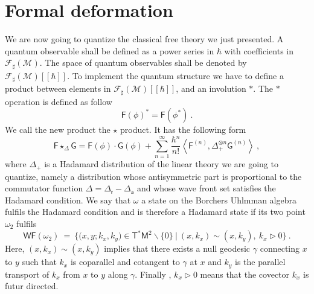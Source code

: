 \documentclass[10pt]{book}
\newcommand{\WF}{\mathsf{WF}}
\newcommand{\sm}[1]{\left\langle#1\right\rangle}
\newcommand{\Fcal}{\mathcal{F}}
\newcommand{\Mcal}{\mathcal{M}}
\newcommand{\Fsf}{\mathsf{F}}
\newcommand{\Gsf}{\mathsf{G}}
\newcommand{\Msf}{\mathsf{M}}
\newcommand{\Tsf}{\mathsf{T}}
\newcommand{\asf}{\mathsf{a}}
\newcommand{\rsf}{\mathsf{r}}
\theoremstyle{break}
\begin{document}


\section{Formal deformation}


We are now going to quantize the classical free theory we just presented. A quantum observable shall be defined as a power series in $\hbar$ with coefficients in $\Fcal_\sharp(\Mcal)$. The space of quantum observables shall be denoted by $\Fcal_\sharp(\Mcal)[[\hbar]]$. To implement the quantum structure we have to define a product between elements in $\Fcal_\sharp(\Mcal)[[\hbar]]$, and an involution $\ast$. The $\ast$ operation is defined as follow
%
\begin{equation*}
\Fsf(\phi)^\ast =  \Fsf(\phi^\ast) \ .
\end{equation*}
%
We call the new product the $\star$ product. It has the following form
%
\begin{equation*}
\Fsf \star_\Delta \Gsf = \Fsf(\phi) \cdot \Gsf(\phi) + \sum_{n=1}^\infty \frac{\hbar^n}{n!} \sm{ \Fsf^{(n)} , \Delta_+^{\otimes n} \Gsf^{(n) } } \ ,
\end{equation*}
%
where $\Delta_+$ is a Hadamard distribution of the linear theory we are going to quantize, namely a distribution whose antisymmetric part is proportional to the commutator function $\Delta = \Delta_\rsf - \Delta_\asf$ and whose wave front set satisfies the Hadamard condition. We say that $\omega$ a state on the Borchers Uhlmman algebra fulfils the Hadamard condition and is therefore a Hadamard state if its two point $\omega_2$ fulfils
%
\begin{equation*}
\WF(\omega_2) \ = \ \bigg\{ \bigg( x, y ; k_x, k_y \bigg) \in \Tsf^\ast\Msf^2 \backslash \{0\} \ \bigg| \ (x,k_x) \sim (x,k_y), \ k_x \triangleright 0 \bigg\} \ .
\label{eq:Hadamard_condition}
\end{equation*}
%
Here, $(x,k_x) \sim (x,k_y)$ implies that there exists a null geodesic $\gamma$ connecting $x$ to $y$ such that $k_x$ is coparallel and cotangent to $\gamma$ at $x$ and $k_y$ is the parallel transport of $k_x$ from $x$ to $y$ along $\gamma$. Finally , $k_x \triangleright 0$ means that the covector $k_x$ is futur directed.  
\end{document}
